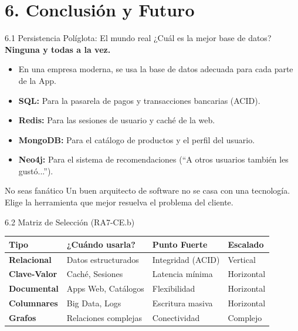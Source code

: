 \section{6. Conclusión y Futuro}

\begin{frame}{6.1 Persistencia Políglota: El mundo real}
    ¿Cuál es la mejor base de datos? \textbf{Ninguna y todas a la vez.}
    
    \begin{itemize}
        \item En una empresa moderna, se usa la base de datos adecuada para cada parte de la App.
        \item \textbf{SQL:} Para la pasarela de pagos y transacciones bancarias (ACID).
        \item \textbf{Redis:} Para las sesiones de usuario y caché de la web.
        \item \textbf{MongoDB:} Para el catálogo de productos y el perfil del usuario.
        \item \textbf{Neo4j:} Para el sistema de recomendaciones (``A otros usuarios también les gustó...'').
    \end{itemize}
    \begin{alertblock}{No seas fanático}
        Un buen arquitecto de software no se casa con una tecnología. Elige la herramienta que mejor resuelva el problema del cliente.
    \end{alertblock}
\end{frame}

\begin{frame}{6.2 Matriz de Selección (RA7-CE.b)}
    \begin{table}[]
    \centering
    \tiny
    \begin{tabular}{@{}llll@{}}
    \toprule
    \textbf{Tipo} & \textbf{¿Cuándo usarla?} & \textbf{Punto Fuerte} & \textbf{Escalado} \\ \midrule
    \textbf{Relacional} & Datos estructurados & Integridad (ACID) & Vertical \\
    \textbf{Clave-Valor} & Caché, Sesiones & Latencia mínima & Horizontal \\
    \textbf{Documental} & Apps Web, Catálogos & Flexibilidad & Horizontal \\
    \textbf{Columnares} & Big Data, Logs & Escritura masiva & Horizontal \\
    \textbf{Grafos} & Relaciones complejas & Conectividad & Complejo \\ \bottomrule
    \end{tabular}
    \end{table}
\end{frame}

